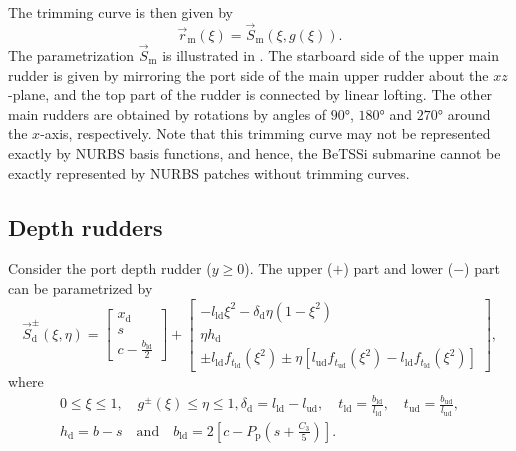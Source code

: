 The trimming curve is then given by
\begin{equation*}
	\vec{r}_{\mathrm{m}}(\xi) = \vec{S}_{\mathrm{m}}(\xi,g(\xi)).
\end{equation*}
The parametrization $\vec{S}_{\mathrm{m}}$ is illustrated in . The starboard side of the upper main rudder is given by mirroring the port side of the main upper rudder about the $xz$-plane, and the top part of the rudder is connected by linear lofting. The other main rudders are obtained by rotations by angles of $\ang{90}$, $\ang{180}$ and $\ang{270}$ around the $x$-axis, respectively. Note that this trimming curve may not be represented exactly by NURBS basis functions, and hence, the BeTSSi submarine cannot be exactly represented by NURBS patches without trimming curves.

\subsection{Depth rudders}
Consider the port depth rudder ($y\geq 0$). The upper ($+$) part and lower ($-$) part can be parametrized by
\begin{equation}\label{Eq3:depthRudders}
	\vec{S}_{\mathrm{d}}^\pm(\xi,\eta) = \begin{bmatrix}
		x_{\mathrm{d}}\\
		s\\
		c-\frac{b_{\mathrm{ld}}}{2}
\end{bmatrix}	 + \begin{bmatrix}
	-l_{\mathrm{ld}} \xi^2-\delta_{\mathrm{d}}\eta\left(1-\xi^2\right)\\
	\eta h_{\mathrm{d}}\\
	\pm l_{\mathrm{ld}}f_{t_{\mathrm{ld}}}(\xi^2) \pm \eta\left[l_{\mathrm{ud}}f_{t_{\mathrm{ud}}}(\xi^2)-l_{\mathrm{ld}}f_{t_{\mathrm{ld}}}(\xi^2)\right]
	\end{bmatrix},
\end{equation}
where
\begin{equation*}
\begin{aligned}
	0\leq \xi\leq 1,\quad g^\pm(\xi)\leq \eta \leq 1,
	\delta_{\mathrm{d}}=l_{\mathrm{ld}}-l_{\mathrm{ud}},\quad t_{\mathrm{ld}}=\frac{b_{\mathrm{ld}}}{l_{\mathrm{ld}}},\quad t_{\mathrm{ud}}=\frac{b_{\mathrm{ud}}}{l_{\mathrm{ud}}},\\
	h_{\mathrm{d}}=b-s\quad\text{and}\quad b_{\mathrm{ld}}=2\left[c-P_{\mathrm{p}}\left(s+\frac{C_3}{5}\right)\right].
\end{aligned}
\end{equation*}
